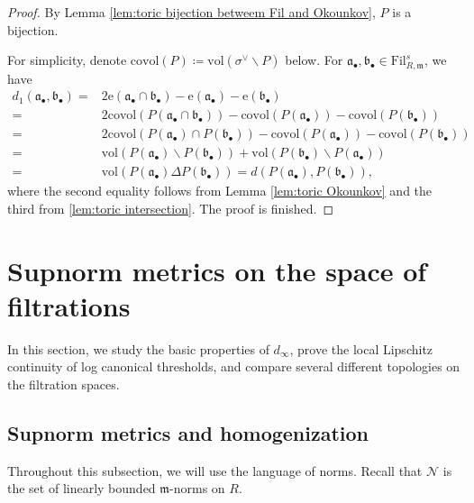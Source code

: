 \documentclass[11pt, leqno]{amsart}%
\theoremstyle{plain}
\theoremstyle{definition}
\theoremstyle{remark}
\newcommand{\cN}{\mathcal{N}}
\newcommand{\fa}{\mathfrak{a}}
\newcommand{\fb}{\mathfrak{b}}
\newcommand{\fm}{\mathfrak{m}}
\newcommand{\vol}{\mathrm{vol}}
\newcommand{\e}{\mathrm{e}}
\newcommand{\Fil}{\mathrm{Fil}}
\newcommand{\covol}{\mathrm{covol}}
\numberwithin{equation}{section}
\begin{document}
\begin{proof}
    By Lemma \ref{lem:toric bijection betweem Fil and Okounkov}, $P$ is a bijection. 
    
    For simplicity, denote $\covol(P)\coloneqq \vol(\sigma^\vee\backslash P)$ below. For $\fa_\bullet,\fb_\bullet\in\Fil^s_{R,\fm}$, we have
    \begin{align*}
        d_1(\fa_\bullet,\fb_\bullet)=&2\e(\fa_\bullet\cap\fb_\bullet)-\e(\fa_\bullet)-\e(\fb_\bullet)\\
         =&2\covol(P(\fa_\bullet\cap\fb_\bullet))-\covol(P(\fa_\bullet))-\covol(P(\fb_\bullet))\\
         =&2\covol(P(\fa_\bullet)\cap P(\fb_\bullet))-\covol(P(\fa_\bullet))-\covol(P(\fb_\bullet))\\
         =&\vol(P(\fa_\bullet)\backslash P(\fb_\bullet))+\vol(P(\fb_\bullet)\backslash P(\fa_\bullet))\\
         =&\vol(P(\fa_\bullet)\Delta P(\fb_\bullet))=d(P(\fa_\bullet),P(\fb_\bullet)),
    \end{align*}
    where the second equality follows from Lemma \ref{lem:toric Okounkov} and the third from \ref{lem:toric intersection}. The proof is finished. 
\end{proof}
























\section{Supnorm metrics on the space of filtrations}\label{sec:d_infty}

In this section, we study the basic properties of $d_\infty$, prove the local Lipschitz continuity of log canonical thresholds, and compare several different topologies on the filtration spaces.

\subsection{Supnorm metrics and homogenization}

Throughout this subsection, we will use the language of norms. Recall that $\cN$ is the set of linearly bounded $\fm$-norms on $R$.
\end{document}
